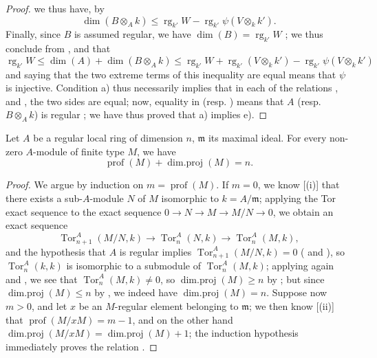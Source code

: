 \begin{proof}
we thus have, by 
\[
\label{0.17.3.3.5}
  \dim(B\otimes_A k)\leq\operatorname{rg}_{k'}W-\operatorname{rg}_{k'}\psi(V\otimes_k k').
  \tag{17.3.3.5}
\]
Finally, since $B$ is assumed regular, we have $\dim(B)=\operatorname{rg}_{k'}W$ ;
we thus conclude from ,  and  that
\[
  \operatorname{rg}_{k'}W\leq\dim(A)+\dim(B\otimes_A k)\leq\operatorname{rg}_{k'}W+\operatorname{rg}_{k'}(V\otimes_k k')-\operatorname{rg}_{k'}\psi(V\otimes_k k')
\]
and saying that the two extreme terms of this inequality are equal means that $\psi$ is injective.
Condition a) thus necessarily implies that in each of the relations ,  and , the two sides are equal;
now, equality in  (resp. ) means that $A$ (resp. $B\otimes_A k$) is regular ;
we have thus proved that a) implies e).
\end{proof}

\begin{proposition}[17.3.4]
\label{0.17.3.4}
Let $A$ be a regular local ring of dimension $n$, $\mathfrak{m}$ its maximal ideal.
For every non-zero $A$-module of finite type $M$, we have
\[
\label{0.17.3.4.1}
  \operatorname{prof}(M)+\operatorname{dim.proj}(M)=n.
  \tag{17.3.4.1}
\]
\end{proposition}

\begin{proof}
We argue by induction on $m=\operatorname{prof}(M)$.
If $m=0$, we know [(i)] that there exists a sub-$A$-module $N$ of $M$ isomorphic to $k=A/\mathfrak{m}$;
applying the Tor exact sequence to the exact sequence $0\to N\to M\to M/N\to 0$, we obtain an exact sequence
\[
  \operatorname{Tor}^A_{n+1}(M/N,k)\to\operatorname{Tor}^A_n(N,k)\to\operatorname{Tor}^A_n(M,k),
\]
and the hypothesis that $A$ is regular implies $\operatorname{Tor}^A_{n+1}(M/N,k)=0$ ( and ), so $\operatorname{Tor}^A_n(k,k)$ is isomorphic to a submodule of $\operatorname{Tor}^A_n(M,k)$;
applying again  and , we see that $\operatorname{Tor}^A_n(M,k)\neq 0$, so $\operatorname{dim.proj}(M)\geq n$ by ;
but since $\operatorname{dim.proj}(M)\leq n$ by , we indeed have $\operatorname{dim.proj}(M)=n$.
Suppose now $m>0$, and let $x$ be an $M$-regular element belonging to $\mathfrak{m}$;
we then know [(ii)] that $\operatorname{prof}(M/xM)=m-1$, and on the other hand  $\operatorname{dim.proj}(M/xM)=\operatorname{dim.proj}(M)+1$;
the induction hypothesis immediately proves the relation .
\end{proof}

